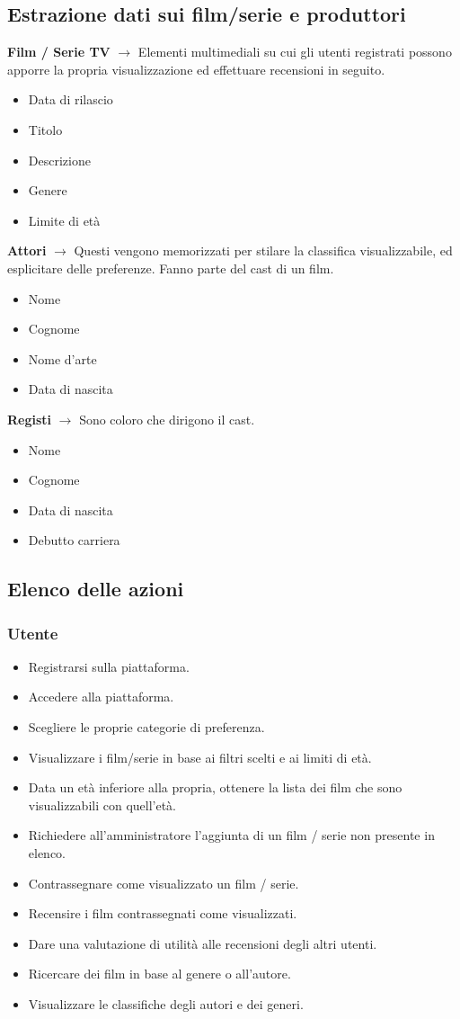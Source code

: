 \documentclass[a4paper,12pt]{report}
\begin{document}
	\subsection{Estrazione dati sui film/serie e produttori}
	\textbf{Film / Serie TV} $\longrightarrow$ Elementi multimediali su cui gli utenti registrati possono apporre la propria visualizzazione ed effettuare recensioni in seguito.
	\begin{itemize}
		\item Data di rilascio
		\item Titolo
		\item Descrizione
		\item Genere
		\item Limite di età
	\end{itemize}
	\textbf{Attori} $\longrightarrow$ Questi vengono memorizzati per stilare la classifica visualizzabile, ed esplicitare delle preferenze. Fanno parte del cast di un film.
	\begin{itemize}
		\item Nome
		\item Cognome
		\item Nome d'arte
		\item Data di nascita
	\end{itemize}
	\textbf{Registi} $\longrightarrow$ Sono coloro che dirigono il cast.
	\begin{itemize}
		\item Nome
		\item Cognome
		\item Data di nascita
		\item Debutto carriera
	\end{itemize}
	\subsection{Elenco delle azioni}
	\subsubsection{Utente}
	\begin{itemize}
		\item Registrarsi sulla piattaforma.
		\item Accedere alla piattaforma.
		\item Scegliere le proprie categorie di preferenza.
		\item Visualizzare i film/serie in base ai filtri scelti e ai limiti di età.
		\item Data un età inferiore alla propria, ottenere la lista dei film che sono visualizzabili con quell'età.
		\item Richiedere all'amministratore l'aggiunta di un film / serie non presente in elenco.
		\item Contrassegnare come visualizzato un film / serie.
		\item Recensire i film contrassegnati come visualizzati.
		\item Dare una valutazione di utilità alle recensioni degli altri utenti.
		\item Ricercare dei film in base al genere o all'autore.
		\item Visualizzare le classifiche degli autori e dei generi.
	\end{itemize}
\end{document}
